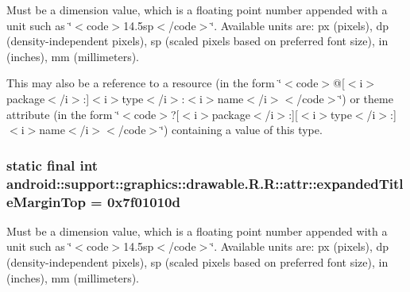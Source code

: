 Must be a dimension value, which is a floating point number appended with a unit such as \char`\"{}$<$code$>$14.5sp$<$/code$>$\char`\"{}. Available units are: px (pixels), dp (density-independent pixels), sp (scaled pixels based on preferred font size), in (inches), mm (millimeters). 

This may also be a reference to a resource (in the form \char`\"{}$<$code$>$@\mbox{[}$<$i$>$package$<$/i$>$:\mbox{]}$<$i$>$type$<$/i$>$:$<$i$>$name$<$/i$>$$<$/code$>$\char`\"{}) or theme attribute (in the form \char`\"{}$<$code$>$?\mbox{[}$<$i$>$package$<$/i$>$:\mbox{]}\mbox{[}$<$i$>$type$<$/i$>$:\mbox{]}$<$i$>$name$<$/i$>$$<$/code$>$\char`\"{}) containing a value of this type. \hypertarget{classandroid_1_1support_1_1graphics_1_1drawable_1_1_r_1_1attr_7bab5b962fbe3800e4eec67d02a09bb8}{
\subsubsection[{expandedTitleMarginTop}]{\setlength{\rightskip}{0pt plus 5cm}static final int android::support::graphics::drawable.R.R::attr::expandedTitleMarginTop = 0x7f01010d}}
\label{classandroid_1_1support_1_1graphics_1_1drawable_1_1_r_1_1attr_7bab5b962fbe3800e4eec67d02a09bb8}


Must be a dimension value, which is a floating point number appended with a unit such as \char`\"{}$<$code$>$14.5sp$<$/code$>$\char`\"{}. Available units are: px (pixels), dp (density-independent pixels), sp (scaled pixels based on preferred font size), in (inches), mm (millimeters). 

